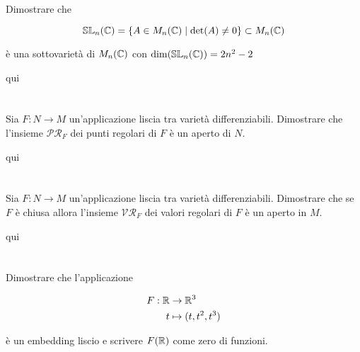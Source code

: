 \begin{tcolorbox}
	Dimostrare che
	
	\begin{equation}
		\mathbb{SL}_{n}(\mathbb{C}) = \{ A \in M_{n}(\mathbb{C}) \mid \det(A) \neq 0 \} \subset M_{n}(\mathbb{C})
	\end{equation}

	è una sottovarietà di $ M_{n}(\mathbb{C}) $ con $ \dim(\mathbb{SL}_{n}(\mathbb{C})) = 2n^{2}-2  $
\end{tcolorbox}

qui

\tocless\section{}\label{es2-17}

\begin{tcolorbox}
	Sia $ F : N \to M $ un'applicazione liscia tra varietà differenziabili. Dimostrare che l'insieme $ \mathcal{PR}_{F} $ dei punti regolari di $ F $ è un aperto di $ N $.
\end{tcolorbox}

qui

\tocless\section{}\label{es2-18}

\begin{tcolorbox}
		Sia $ F : N \to M $ un'applicazione liscia tra varietà differenziabili. Dimostrare che se $ F $ è chiusa allora  l'insieme $ \mathcal{VR}_{F} $ dei valori regolari di $ F $ è un aperto in $ M $.
\end{tcolorbox}

qui

\tocless\section{}\label{es2-19}

\begin{tcolorbox}
	Dimostrare che l'applicazione
	
	\begin{align}
		\begin{split}
			F : \mathbb{R} &\to \mathbb{R}^{3}\\
			t &\mapsto (t,t^{2},t^{3})
		\end{split}
	\end{align}

	è un embedding liscio e scrivere $ F(\mathbb{R}) $ come zero di funzioni.
\end{tcolorbox}

